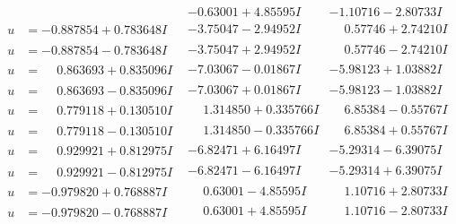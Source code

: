 \documentclass[1p]{elsarticle_modified}
\theoremstyle{definition}
\begin{document}
$$\begin{array}{c|c|c}
 & -0.63001 + 4.85595 I & -1.10716 - 2.80733 I \\ \hline\begin{aligned}
u &= -0.887854 + 0.783648 I\end{aligned}
 & -3.75047 - 2.94952 I & \phantom{-}0.57746 + 2.74210 I \\ \hline\begin{aligned}
u &= -0.887854 - 0.783648 I\end{aligned}
 & -3.75047 + 2.94952 I & \phantom{-}0.57746 - 2.74210 I \\ \hline\begin{aligned}
u &= \phantom{-}0.863693 + 0.835096 I\end{aligned}
 & -7.03067 - 0.01867 I & -5.98123 + 1.03882 I \\ \hline\begin{aligned}
u &= \phantom{-}0.863693 - 0.835096 I\end{aligned}
 & -7.03067 + 0.01867 I & -5.98123 - 1.03882 I \\ \hline\begin{aligned}
u &= \phantom{-}0.779118 + 0.130510 I\end{aligned}
 & \phantom{-}1.314850 + 0.335766 I & \phantom{-}6.85384 - 0.55767 I \\ \hline\begin{aligned}
u &= \phantom{-}0.779118 - 0.130510 I\end{aligned}
 & \phantom{-}1.314850 - 0.335766 I & \phantom{-}6.85384 + 0.55767 I \\ \hline\begin{aligned}
u &= \phantom{-}0.929921 + 0.812975 I\end{aligned}
 & -6.82471 + 6.16497 I & -5.29314 - 6.39075 I \\ \hline\begin{aligned}
u &= \phantom{-}0.929921 - 0.812975 I\end{aligned}
 & -6.82471 - 6.16497 I & -5.29314 + 6.39075 I \\ \hline\begin{aligned}
u &= -0.979820 + 0.768887 I\end{aligned}
 & \phantom{-}0.63001 - 4.85595 I & \phantom{-}1.10716 + 2.80733 I \\ \hline\begin{aligned}
u &= -0.979820 - 0.768887 I\end{aligned}
 & \phantom{-}0.63001 + 4.85595 I & \phantom{-}1.10716 - 2.80733 I \\ \hline\begin{aligned}

\end{aligned}
\end{array}$$
\end{document}
